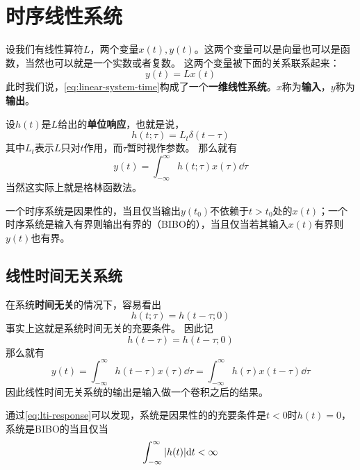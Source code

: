 \documentclass[UTF8]{ctexart}
\begin{document}
\section{时序线性系统}

设我们有线性算符$L$，两个变量$x(t), y(t)$。这两个变量可以是向量也可以是函数，当然也可以就是一个实数或者复数。
这两个变量被下面的关系联系起来：
\begin{equation}
    y(t) = Lx(t)
    \label{eq:linear-system-time}
\end{equation}
此时我们说，\eqref{eq:linear-system-time}构成了一个\textbf{一维线性系统}。$x$称为\textbf{输入}，$y$称为\textbf{输出}。

设$h(t)$是$L$给出的\textbf{单位响应}，也就是说，
\begin{equation}
    h(t;\tau) = L_{t} \delta(t - \tau)
    \label{eq:unit-response}
\end{equation}
其中$L_t$表示$L$只对$t$作用，而$\tau$暂时视作参数。
那么就有
\begin{equation}
    y(t) = \int_{-\infty}^\infty h(t;\tau) x(\tau) \dd \tau
\end{equation}
当然这实际上就是格林函数法。

一个时序系统是因果性的，当且仅当输出$y(t_0)$不依赖于$t > t_0$处的$x(t)$；一个时序系统是输入有界则输出有界的（BIBO的），当且仅当若其输入$x(t)$有界则$y(t)$也有界。

\subsection{线性时间无关系统}

在系统\textbf{时间无关}的情况下，容易看出
\begin{equation}
    h(t;\tau) = h(t - \tau; 0)
    \label{eq:lti-condition}
\end{equation}
事实上这就是系统时间无关的充要条件。
因此记
\begin{equation}
    h(t - \tau) = h(t - \tau; 0)
\end{equation}
那么就有
\begin{equation}
    y(t) = \int_{-\infty}^\infty h(t - \tau) x(\tau) \dd \tau = \int_{-\infty}^\infty h(\tau) x(t - \tau) \dd \tau
    \label{eq:lti-response}
\end{equation}
因此线性时间无关系统的输出是输入做一个卷积之后的结果。

通过\eqref{eq:lti-response}可以发现，系统是因果性的的充要条件是$t<0$时$h(t)=0$，系统是BIBO的当且仅当
\[
    \int_{-\infty}^\infty \abs{h(t)} \dd t < \infty
\]
\end{document}

